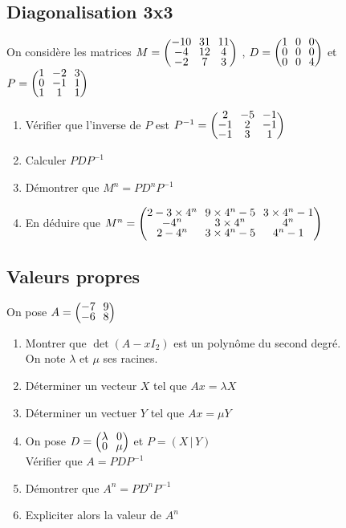 \documentclass[oneside,12pt]{book}          %
\begin{document}
\subsection{Diagonalisation 3x3}
On considère les matrices $M=\matrice{-10&31&11\\-4&12&4\\-2&7&3} $ , $D=\matrice{1&0&0\\0&0&0\\0&0&4} $ et $P=\matrice{1&-2&3\\0&-1&1\\1&1&1} $
\begin{enumerate}
    \item Vérifier que l'inverse de $P$ est $P^{-1}=\matrice{2&-5&-1\\-1&2&-1\\-1&3&1} $
    \item Calculer $PDP^{-1}$
    \item Démontrer que $M^n=PD^nP^{-1}$
    \item En déduire que $M^n=\matrice{2-3\times4^n&9\times4^n-5&3\times4^n-1\\-4^n&3\times4^n&4^n\\2-4^n&  3\times4^n-5&4^n-1} $
\end{enumerate}



\subsection{Valeurs propres}
On pose $A=\matrice{-7&9\\-6&8}$
\begin{enumerate}
    \item Montrer que $\det(A-xI_2)$ est un polynôme du second degré.\\
    On note $\lambda$ et $\mu$ ses racines.
    \item Déterminer un vecteur $X$ tel que $Ax=\lambda X$
    \item Déterminer un vectuer $Y$ tel que $Ax = \mu Y$
    \item On pose $D=\matrice{\lambda&0\\0&\mu}$ et $P=(X\,|\,Y)$\\
    Vérifier que $A=PDP^{-1}$
    \item Démontrer que $A^n=PD^nP^{-1}$
    \item Expliciter alors la valeur de $A^n$
\end{enumerate}
\end{document}
